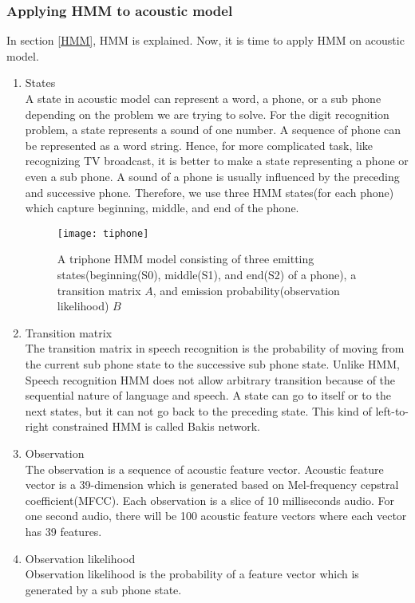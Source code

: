 \subsubsection{Applying HMM to acoustic model}
In section \ref{HMM}, HMM is explained. Now, it is time to apply HMM on acoustic model. 
\begin{enumerate}
\item States \\
A state in acoustic model can represent a word, a phone, or a sub phone depending on the problem we are trying to solve. For the digit recognition problem, a state represents a sound of one number. A sequence of phone can be represented as a word string. Hence, for more complicated task, like recognizing TV broadcast, it is better to make a state representing a phone or even a sub phone. A sound of a phone is usually influenced by the preceding and successive phone. Therefore, we use three HMM states(for each phone) which capture beginning, middle, and  end of the phone. 

\begin{figure}[H]
\caption{A triphone HMM model consisting of three emitting states(beginning(S0), middle(S1), and end(S2) of a phone), a transition matrix $A$, and emission probability(observation likelihood) $B$ \cite{SiliconAM}}
\texttt{[image: tiphone]}
\centering
\end{figure}

\item Transition matrix \\
The transition matrix in speech recognition is the probability of moving from the current sub phone state to the successive sub phone state. Unlike HMM, Speech recognition HMM does not allow arbitrary transition because of the sequential nature of language and speech. A state can go to itself or to the next states, but it can not go back to the preceding state. This kind of left-to-right constrained HMM is called Bakis network.

\item Observation \\
The observation is a sequence of acoustic feature vector. Acoustic feature vector is a 39-dimension which is generated based on Mel-frequency cepstral coefficient(MFCC). Each observation is a slice of 10 milliseconds audio. For one second audio, there will be 100 acoustic feature vectors where each vector has 39 features.

\item Observation likelihood \\
Observation likelihood is the probability of a feature vector which is generated by a sub phone state. 

\end{enumerate}


